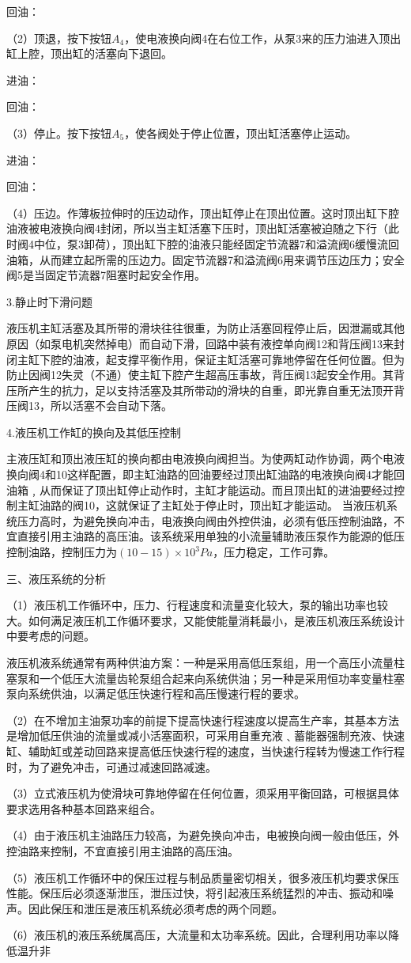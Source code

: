 回油：

（2）顶退，按下按钮$A_4$，使电液换向阀4在右位工作，从泵3来的压力油进入顶出缸上腔，顶出缸的活塞向下退回。

进油：

回油：

（3）停止。按下按钮$A_5$，使各阀处于停止位置，顶出缸活塞停止运动。

进油：

回油：

（4）压边。作薄板拉伸时的压边动作，顶出缸停止在顶出位置。这时顶出缸下腔油液被电液换向阀4封闭，所以当主缸活塞下压时，顶出缸活塞被迫随之下行（此时阀4中位，泵3卸荷），顶出缸下腔的油液只能经固定节流器7和溢流阀6缓慢流回油箱，从而建立起所需的压边力。固定节流器7和溢流阀6用来调节压边压力；安全阀5是当固定节流器7阻塞时起安全作用。

3.静止时下滑问题

液压机主缸活塞及其所带的滑块往往很重，为防止活塞回程停止后，因泄漏或其他原因（如泵电机突然掉电）而自动下滑，回路中装有液控单向阀12和背压阀13来封闭主缸下腔的油液，起支撑平衡作用，保证主缸活塞可靠地停留在任何位置。但为防止因阀12失灵（不通）使主缸下腔产生超高压事故，背压阀13起安全作用。其背压所产生的抗力，足以支持活塞及其所带动的滑块的自重，即光靠自重无法顶开背压阀13，所以活塞不会自动下落。

4.液压机工作缸的换向及其低压控制

主液压缸和顶出液压缸的换向都由电液换向阀担当。为使两缸动作协调，两个电液换向阀4和10这样配置，即主缸油路的回油要经过顶出缸油路的电液换向阀4才能回油箱﹐从而保证了顶出缸停止动作时，主缸才能运动。而且顶出缸的进油要经过控制主缸油路的阀10，这就保证了主缸处于停止时，顶出缸才能运动。
当液压机系统压力高时，为避免换向冲击，电液换向阀由外控供油，必须有低压控制油路，不宜直接引用主油路的高压油。该系统采用单独的小流量辅助液压泵作为能源的低压控制油路，控制压力为$(10-15)×10^3Pa$，压力稳定，工作可靠。

三、液压系统的分析

（1）液压机工作循环中，压力、行程速度和流量变化较大，泵的输出功率也较大。如何满足液压机工作循环要求，又能使能量消耗最小，是液压机液压系统设计中要考虑的问题。

液压机液系统通常有两种供油方案：一种是采用高低压泵组，用一个高压小流量柱塞泵和一个低压大流量齿轮泵组合起来向系统供油；另一种是采用恒功率变量柱塞泵向系统供油，以满足低压快速行程和高压慢速行程的要求。

（2）在不增加主油泵功率的前提下提高快速行程速度以提高生产率，其基本方法是增加低压供油的流量或减小活塞面积，可采用自重充液﹑蓄能器强制充液、快速缸、辅助缸或差动回路来提高低压快速行程的速度，当快速行程转为慢速工作行程时，为了避免冲击，可通过减速回路减速。

（3）立式液压机为使滑块可靠地停留在任何位置，须采用平衡回路，可根据具体要求选用各种基本回路来组合。

（4）由于液压机主油路压力较高，为避免换向冲击，电被换向阀一般由低压，外控油路来控制，不宜直接引用主油路的高压油。

（5）液压机工作循环中的保压过程与制品质量密切相关，很多液压机均要求保压性能。保压后必须逐渐泄压，泄压过快，将引起液压系统猛烈的冲击、振动和噪声。因此保压和泄压是液压机系统必须考虑的两个同题。

（6）液压机的液压系统属高压，大流量和太功率系统。因此，合理利用功率以降低温升非


